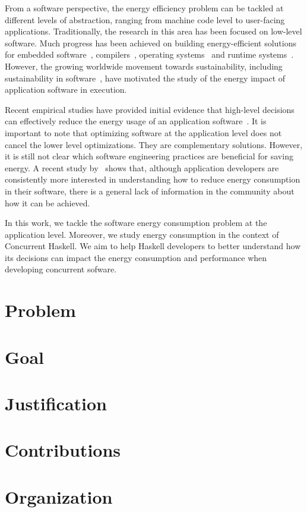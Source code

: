 From a software perspective, the energy efficiency problem can be tackled at different levels of abstraction, ranging from machine code level to user-facing applications. Traditionally, the research in this area has been focused on low-level software. Much progress has been achieved on building energy-efficient solutions for embedded software~\cite{tiwari:1994}, compilers~\cite{hsu:2003}, operating systems~\cite{merkel:2006} and runtime systems~\cite{ribic:2014, farkas:2000}. However, the growing worldwide movement towards sustainability, including sustainability in software~\cite{becker:2015}, have motivated the study of the energy impact of application software in execution.

Recent empirical studies have provided initial evidence that high-level decisions can effectively reduce the energy usage of an application software~\cite{chung:2001,hindle:2012,pinto:2014,trefethen:2013,manotas:2014,sahin:2014}. It is important to note that optimizing software at the application level does not cancel the lower level optimizations. They are complementary solutions. However, it is still not clear which software engineering practices are beneficial for saving energy. A recent study by~ shows that, although application developers are consistently more interested in understanding how to reduce energy consumption in their software, there is a general lack of information in the community about how it can be achieved.

In this work, we tackle the software energy consumption problem at the application level. Moreover, we study energy consumption in the context of Concurrent Haskell. We aim to help Haskell developers to better understand how its decisions can impact the energy consumption and performance when developing  concurrent sofware.


\section{Problem}
\lipsum[1-2]


\section{Goal}
\lipsum[3-4]


\section{Justification}
\lipsum[5-6]


\section{Contributions}
\lipsum[7-8]


\section{Organization}
\lipsum[9-10]
